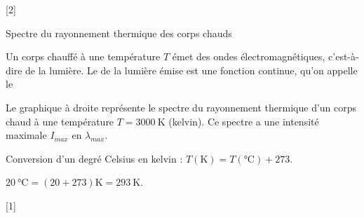 [2]


\pasCorrection{\newpage\vspace*{-36pt}}
\begin{doc}{Spectre du rayonnement thermique des corps chauds}
  \begin{figure}
    \vspace*{-20pt}
    \centering
  \end{figure}
  \strut\vspace*{-22pt}
  
  \begin{importants}  
    Un corps chauffé à une température $T$ émet des ondes électromagnétiques, c'est-à-dire de la lumière.
    Le  de la lumière émise est une fonction continue, qu'on appelle le 
  \end{importants}

  Le graphique à droite représente le spectre du rayonnement thermique d'un corps chaud à une température $T = \qty{3000}{\kelvin}$ (kelvin).
  Ce spectre a une intensité maximale $I_{max}$ en $\lambda_{max}$.
  \medskip

  \begin{importants}
    Conversion d'un degré Celsius en kelvin :
    $T(\unit{\kelvin}) = T(\unit{\degreeCelsius}) + 273$.
    
    \exemple $\qty{20}{\degreeCelsius} = (20 + 273) \unit{\kelvin} = \qty{293}{\kelvin}$.
  \end{importants}
\end{doc}

[1]

